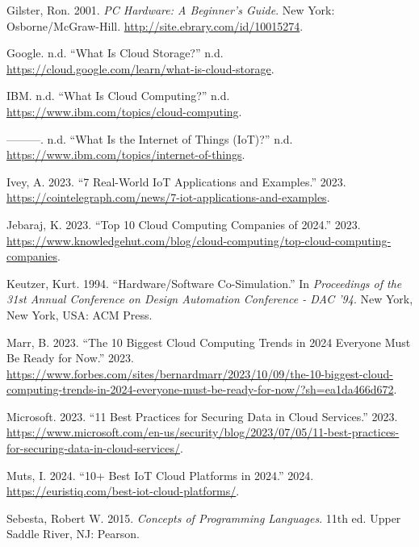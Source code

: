 \documentclass[
  letterpaper,
  DIV=11,
  numbers=noendperiod]{scrreprt}
\newlength{\cslhangindent}
\newenvironment{CSLReferences}[2] %
 {\begin{list}{}{%
  \setlength{\itemindent}{0pt}
  \setlength{\leftmargin}{0pt}
  \setlength{\parsep}{0pt}
  \ifodd #1
   \setlength{\leftmargin}{\cslhangindent}
   \setlength{\itemindent}{-1\cslhangindent}
  \fi
  \setlength{\itemsep}{#2\baselineskip}}}
 {\end{list}}
\begin{document}
\begin{CSLReferences}{1}{0}
Gilster, Ron. 2001. \emph{{PC} Hardware: A Beginner's Guide}. New York:
Osborne/{McGraw}-Hill. \url{http://site.ebrary.com/id/10015274}.

Google. n.d. {``What Is Cloud Storage?''} n.d.
\url{https://cloud.google.com/learn/what-is-cloud-storage}.

IBM. n.d. {``What Is Cloud Computing?''} n.d.
\url{https://www.ibm.com/topics/cloud-computing}.

---------. n.d. {``What Is the Internet of Things (IoT)?''} n.d.
\url{https://www.ibm.com/topics/internet-of-things}.

Ivey, A. 2023. {``7 Real-World IoT Applications and Examples.''} 2023.
\url{https://cointelegraph.com/news/7-iot-applications-and-examples}.

Jebaraj, K. 2023. {``Top 10 Cloud Computing Companies of 2024.''} 2023.
\url{https://www.knowledgehut.com/blog/cloud-computing/top-cloud-computing-companies}.

Keutzer, Kurt. 1994. {``Hardware/Software Co-Simulation.''} In
\emph{Proceedings of the 31st Annual Conference on Design Automation
Conference - {DAC} '94}. New York, New York, USA: ACM Press.

Marr, B. 2023. {``The 10 Biggest Cloud Computing Trends in 2024 Everyone
Must Be Ready for Now.''} 2023.
\url{https://www.forbes.com/sites/bernardmarr/2023/10/09/the-10-biggest-cloud-computing-trends-in-2024-everyone-must-be-ready-for-now/?sh=ea1da466d672}.

Microsoft. 2023. {``11 Best Practices for Securing Data in Cloud
Services.''} 2023.
\url{https://www.microsoft.com/en-us/security/blog/2023/07/05/11-best-practices-for-securing-data-in-cloud-services/}.

Muts, I. 2024. {``10+ Best IoT Cloud Platforms in 2024.''} 2024.
\url{https://euristiq.com/best-iot-cloud-platforms/}.

Sebesta, Robert W. 2015. \emph{Concepts of Programming Languages}. 11th
ed. Upper Saddle River, NJ: Pearson.


\end{CSLReferences}
\end{document}
